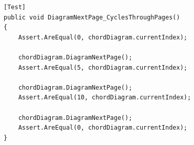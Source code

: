 \begin{lstlisting}[style=sharpcstyle,caption=Funkcja \texttt{DiagramNextPage\_CyclesThroughPages}, label=lst:8]
[Test]
public void DiagramNextPage_CyclesThroughPages()
{
    Assert.AreEqual(0, chordDiagram.currentIndex);

    chordDiagram.DiagramNextPage();
    Assert.AreEqual(5, chordDiagram.currentIndex);

    chordDiagram.DiagramNextPage();
    Assert.AreEqual(10, chordDiagram.currentIndex);

    chordDiagram.DiagramNextPage();
    Assert.AreEqual(0, chordDiagram.currentIndex);
}
\end{lstlisting}